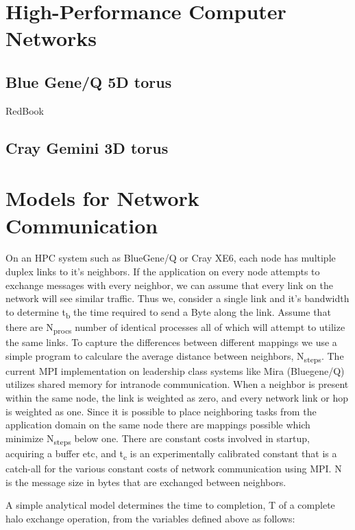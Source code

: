 \documentclass[conference,10pt]{IEEEtran}
\begin{document}
\section{High-Performance Computer Networks}

\subsection{Blue Gene/Q 5D torus}
RedBook~\cite{BGQ_RedBook_2013}

\subsection{Cray Gemini 3D torus}

\section{Models for Network Communication}

On an HPC system such as BlueGene/Q or Cray XE6, each node has multiple duplex links to it's neighbors.
If the application on every node attempts to exchange messages with every neighbor, we can assume that
every link on the network will see similar traffic. Thus we, consider a single link and it's bandwidth
to determine t\textsubscript{b} the time required to send a Byte along the link. Assume that there are N\textsubscript{procs} number
of identical processes all of which will attempt to utilize the same links. To capture the differences
between different mappings we use a simple program to calculare the average distance between neighbors,
N\textsubscript{steps}. The current MPI implementation on leadership class systems like Mira (Bluegene/Q) utilizes
shared memory for intranode communication. When a neighbor is present within the same node, the link
is weighted as zero, and every network link or hop is weighted as one. Since it is possible to place
neighboring tasks from the application domain on the same node there are mappings possible which
minimize N\textsubscript{steps} below one. There are constant costs involved in startup, acquiring a buffer etc,
and t\textsubscript{c} is an experimentally calibrated constant that is a catch-all for the various constant costs
of network communication using MPI. N is the message size in bytes that are exchanged between neighbors.

A simple analytical model determines the time to completion, T of a complete halo exchange operation,
from the variables defined above as follows:
\end{document}
